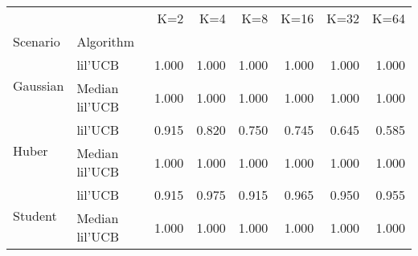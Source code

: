 \begin{tabular}{llrrrrrr}
\toprule
        &                &    K=2 &    K=4 &    K=8 &   K=16 &   K=32 &   K=64 \\
Scenario & Algorithm &        &        &        &        &        &        \\
\midrule
\multirow{2}{*}{Gaussian} & lil'UCB &  1.000 &  1.000 &  1.000 &  1.000 &  1.000 &  1.000 \\
        & Median lil'UCB &  1.000 &  1.000 &  1.000 &  1.000 &  1.000 &  1.000 \\
\cline{1-8}
\multirow{2}{*}{Huber} & lil'UCB &  0.915 &  0.820 &  0.750 &  0.745 &  0.645 &  0.585 \\
        & Median lil'UCB &  1.000 &  1.000 &  1.000 &  1.000 &  1.000 &  1.000 \\
\cline{1-8}
\multirow{2}{*}{Student} & lil'UCB &  0.915 &  0.975 &  0.915 &  0.965 &  0.950 &  0.955 \\
        & Median lil'UCB &  1.000 &  1.000 &  1.000 &  1.000 &  1.000 &  1.000 \\
\bottomrule
\end{tabular}
